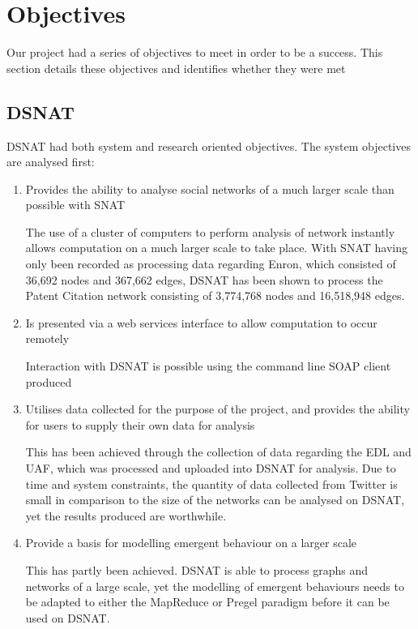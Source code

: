 \section{Objectives}
Our project had a series of objectives to meet in order to be a success. This section details these objectives and identifies whether they were met

\subsection{DSNAT}
DSNAT had both system and research oriented objectives. The system objectives are analysed first:

\begin{enumerate}
  \item Provides the ability to analyse social networks of a much larger scale than possible with SNAT
  
  The use of a cluster of computers to perform analysis of network instantly allows computation on a much larger scale to take place. With SNAT having only been recorded as processing data regarding Enron, which consisted of 36,692 nodes and 367,662 edges, DSNAT has been shown to process the Patent Citation network consisting of 3,774,768 nodes and 16,518,948 edges.
  		
  \item Is presented via a web services interface to allow computation to occur remotely
  
  Interaction with DSNAT is possible using the command line SOAP client produced
  
  \item Utilises data collected for the purpose of the project, and provides the ability for users to supply their own data for analysis
  
  This has been achieved through the collection of data regarding the EDL and UAF, which was processed and uploaded into DSNAT for analysis. Due to time and system constraints, the quantity of data collected from Twitter is small in comparison to the size of the networks can be analysed on DSNAT, yet the results produced are worthwhile.
  
  \item Provide a basis for modelling emergent behaviour on a larger scale
  
  This has partly been achieved. DSNAT is able to process graphs and networks of a large scale, yet the modelling of emergent behaviours needs to be adapted to either the MapReduce or Pregel paradigm before it can be used on DSNAT.
\end{enumerate}

